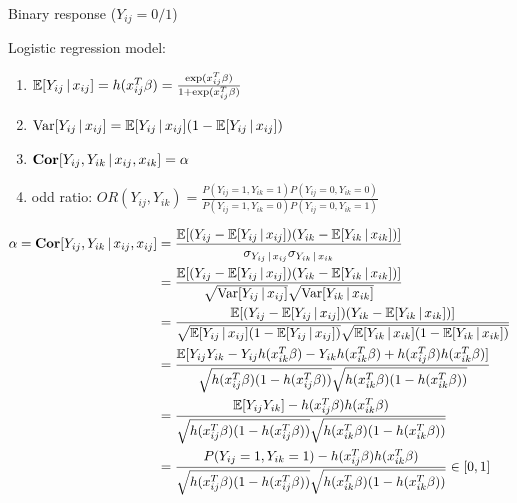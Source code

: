 \documentclass[UTF8,a4paper,10pt]{article}
\begin{document}
  \begin{Problem}[]{}
    Binary response (\(Y_{ij}=0/1\))

    Logistic regression model:
\begin{enumerate}
  \item \(\operatorname{\mathbb{E}}[Y_{ij}\,|\,x_{ij}] = h(x_{ij}^T\beta) = \frac{\exp(x_{ij}^T\beta)}{1+\exp(x_{ij}^T\beta)}\)
  \item \(\operatorname{Var}[Y_{ij}\,|\,x_{ij}] = \operatorname{\mathbb{E}}[Y_{ij}\,|\,x_{ij}](1-\operatorname{\mathbb{E}}[Y_{ij}\,|\,x_{ij}])\)
  \item \(\operatorname{\textbf{Cor}}[Y_{ij},Y_{ik}\,|\,x_{ij},x_{ik}]= \alpha\) 
  \item odd ratio: \(OR(Y_{ij},Y_{ik}) = \frac{P(Y_{ij} = 1,Y_{ik} = 1)P(Y_{ij} = 0,Y_{ik} = 0)}{P(Y_{ij} = 1,Y_{ik} = 0)P(Y_{ij} = 0,Y_{ik} = 1)}\)
\end{enumerate}
    
  \end{Problem}


\begin{equation*}
  \begin{aligned}
    \alpha = \operatorname{\textbf{Cor}}[Y_{ij},Y_{ik}\,|\,x_{ij},x_{ij}] 
    &= \frac{\operatorname{\mathbb{E}}[(Y_{ij}-\operatorname{\mathbb{E}}[Y_{ij}\,|\,x_{ij}])(Y_{ik}-\operatorname{\mathbb{E}}[Y_{ik}\,|\,x_{ik}])]}{\sigma_{Y_{ij}\,|\,x_{ij}}\sigma_{Y_{ik}\,|\,x_{ik}}}\\
    &=\frac{\operatorname{\mathbb{E}}[(Y_{ij}-\operatorname{\mathbb{E}}[Y_{ij}\,|\,x_{ij}])(Y_{ik}-\operatorname{\mathbb{E}}[Y_{ik}\,|\,x_{ik}])]}{\sqrt{\operatorname{Var}[Y_{ij}\,|\,x_{ij}]}\sqrt{\operatorname{Var}[Y_{ik}\,|\,x_{ik}] }}\\
    &=\frac{\operatorname{\mathbb{E}}[(Y_{ij}-\operatorname{\mathbb{E}}[Y_{ij}\,|\,x_{ij}])(Y_{ik}-\operatorname{\mathbb{E}}[Y_{ik}\,|\,x_{ik}])]}{\sqrt{\operatorname{\mathbb{E}}[Y_{ij}\,|\,x_{ij}](1-\operatorname{\mathbb{E}}[Y_{ij}\,|\,x_{ij}])}\sqrt{\operatorname{\mathbb{E}}[Y_{ik}\,|\,x_{ik}](1-\operatorname{\mathbb{E}}[Y_{ik}\,|\,x_{ik}])}}\\
    &=\frac{\operatorname{\mathbb{E}}[Y_{ij}Y_{ik}-Y_{ij}h(x_{ik}^T\beta)-Y_{ik}h(x_{ik}^T\beta)+h(x_{ij}^T\beta)h(x_{ik}^T\beta)]}{\sqrt{h(x_{ij}^T\beta)(1-h(x_{ij}^T\beta))}\sqrt{h(x_{ik}^T\beta)(1-h(x_{ik}^T\beta))}}\\
    &=\frac{\operatorname{\mathbb{E}}[Y_{ij}Y_{ik}]-h(x_{ij}^T\beta)h(x_{ik}^T\beta)}{\sqrt{h(x_{ij}^T\beta)(1-h(x_{ij}^T\beta))}\sqrt{h(x_{ik}^T\beta)(1-h(x_{ik}^T\beta))}}\\
    &=\frac{P(Y_{ij} = 1,Y_{ik} = 1)-h(x_{ij}^T\beta)h(x_{ik}^T\beta)}{\sqrt{h(x_{ij}^T\beta)(1-h(x_{ij}^T\beta))}\sqrt{h(x_{ik}^T\beta)(1-h(x_{ik}^T\beta))}}\in[0,1]
  \end{aligned}
\end{equation*}
\dotfill
\end{document}
